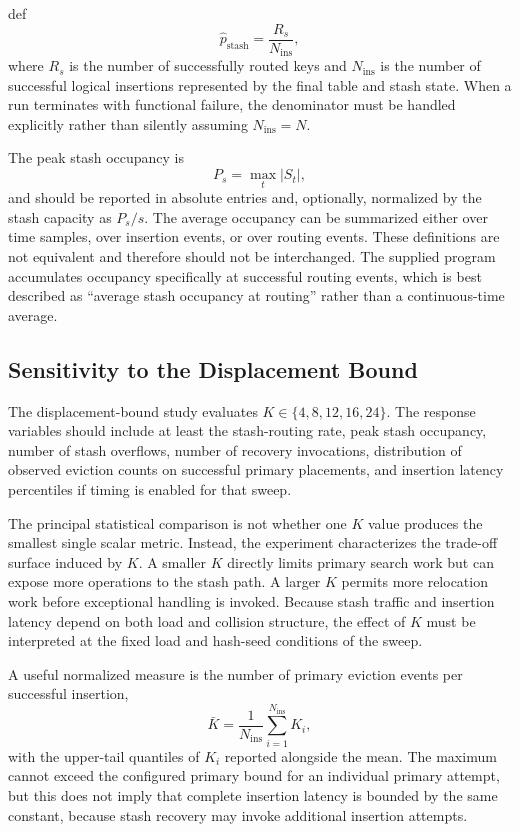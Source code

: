 \documentclass[conference]{IEEEtran}
\begin{document}
def
\begin{equation}
    \hat p_{\mathrm{stash}}
    =
    \frac{R_s}{N_{\mathrm{ins}}},
    \label{eq:stash-routing-prob}
\end{equation}
where $R_s$ is the number of successfully routed keys and $N_{\mathrm{ins}}$
is the number of successful logical insertions represented by the final table
and stash state. When a run terminates with functional failure, the denominator
must be handled explicitly rather than silently assuming $N_{\mathrm{ins}}=N$.

The peak stash occupancy is
\begin{equation}
    P_s=\max_t |S_t|,
    \label{eq:stash-peak-method}
\end{equation}
and should be reported in absolute entries and, optionally, normalized by the
stash capacity as $P_s/s$. The average occupancy can be summarized either over
time samples, over insertion events, or over routing events. These definitions
are not equivalent and therefore should not be interchanged. The supplied
program accumulates occupancy specifically at successful routing events, which
is best described as ``average stash occupancy at routing'' rather than a
continuous-time average.

\subsection{Sensitivity to the Displacement Bound}

The displacement-bound study evaluates $K\in\{4,8,12,16,24\}$. The response
variables should include at least the stash-routing rate, peak stash occupancy,
number of stash overflows, number of recovery invocations, distribution of
observed eviction counts on successful primary placements, and insertion
latency percentiles if timing is enabled for that sweep.

The principal statistical comparison is not whether one $K$ value produces the
smallest single scalar metric. Instead, the experiment characterizes the
trade-off surface induced by $K$. A smaller $K$ directly limits primary search
work but can expose more operations to the stash path. A larger $K$ permits more
relocation work before exceptional handling is invoked. Because stash traffic
and insertion latency depend on both load and collision structure, the effect
of $K$ must be interpreted at the fixed load and hash-seed conditions of the
sweep.

A useful normalized measure is the number of primary eviction events per
successful insertion,
\begin{equation}
    \bar K=\frac{1}{N_{\mathrm{ins}}}
    \sum_{i=1}^{N_{\mathrm{ins}}}K_i,
    \label{eq:mean-kicks}
\end{equation}
with the upper-tail quantiles of $K_i$ reported alongside the mean. The maximum
cannot exceed the configured primary bound for an individual primary attempt,
but this does not imply that complete insertion latency is bounded by the same
constant, because stash recovery may invoke additional insertion attempts.
\end{document}
